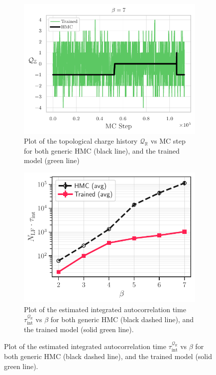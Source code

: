 \documentclass{article} %
\begin{document}
\begin{figure}[htpb]
   \centering
   \begin{subfigure}{0.48\textwidth}
      \includegraphics[width=\textwidth]{figures/topological_freezing_green.pdf}
      \caption{\label{fig:topological_freezing}Plot of the topological charge history \(\mathcal{Q}_{\mathbb{R}}\) vs MC
      step for both generic HMC (black line), and the trained model (green line)}
   \end{subfigure}
   \hfill
   \begin{subfigure}{0.48\textwidth}
      \includegraphics[width=\textwidth]{figures/autocorr_vs_beta.pdf}
      \caption{Plot of the estimated integrated autocorrelation time \(\tau_{\mathrm{int}}^{\mathcal{Q}_{\mathbb{R}}}\)
      vs \(\beta\) for both generic HMC (black dashed line), and the trained model (solid green line).}
   \end{subfigure}
\end{figure}
\end{document}
